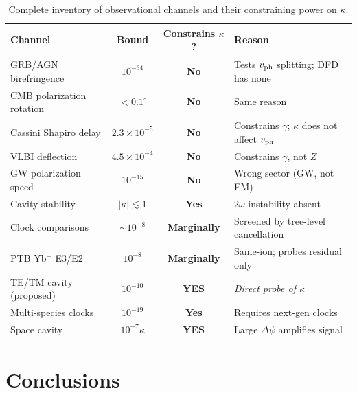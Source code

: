 \documentclass[11pt,a4paper]{article}
\theoremstyle{definition}
\begin{document}
\begin{table}[h!]
\centering
\caption{Complete inventory of observational channels and their
  constraining power on $\kappa$.}
\label{tab:summary}
\small
\begin{tabular}{p{4cm}ccp{4cm}}
\toprule
\textbf{Channel} & \textbf{Bound} &
  \textbf{Constrains $\kappa$?} & \textbf{Reason} \\
\midrule
GRB/AGN birefringence & $10^{-34}$ & \textbf{No} &
  Tests $v_{\rm ph}$ splitting; DFD has none \\
CMB polarization rotation & $<0.1^\circ$ & \textbf{No} &
  Same reason \\
Cassini Shapiro delay & $2.3\times10^{-5}$ & \textbf{No} &
  Constrains $\gamma$; $\kappa$ does not affect $v_{\rm ph}$ \\
VLBI deflection & $4.5\times10^{-4}$ & \textbf{No} &
  Constrains $\gamma$, not $Z$ \\
GW polarization speed & $10^{-15}$ & \textbf{No} &
  Wrong sector (GW, not EM) \\
\midrule
Cavity stability & $|\kappa| \lesssim 1$ & \textbf{Yes} &
  $2\omega$ instability absent \\
Clock comparisons & $\sim 10^{-8}$ & \textbf{Marginally} &
  Screened by tree-level cancellation \\
PTB Yb$^+$ E3/E2 & $10^{-8}$ & \textbf{Marginally} &
  Same-ion; probes residual only \\
\midrule
TE/TM cavity (proposed) & $10^{-10}$ & \textbf{YES} &
  \textit{Direct probe of $\kappa$} \\
Multi-species clocks & $10^{-19}$ & \textbf{Yes} &
  Requires next-gen clocks \\
Space cavity & $10^{-7}\kappa$ & \textbf{YES} &
  Large $\Delta\psi$ amplifies signal \\
\bottomrule
\end{tabular}
\end{table}


\section{Conclusions}
\label{sec:conclusions}
\end{document}
